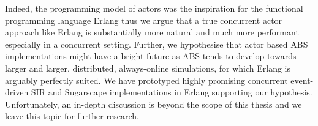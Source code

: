 Indeed, the programming model of actors \cite{agha_actors:_1986} was the inspiration for the functional programming language Erlang thus we argue that a true concurrent actor approach like Erlang is substantially more natural and much more performant especially in a concurrent setting. Further, we hypothesise that actor based ABS implementations might have a bright future as ABS tends to develop towards larger and larger, distributed, always-online simulations, for which Erlang is arguably perfectly suited. We have prototyped highly promising concurrent event-driven SIR and Sugarscape implementations in Erlang supporting our hypothesis. Unfortunately, an in-depth discussion is beyond the scope of this thesis and we leave this topic for further research.



%

